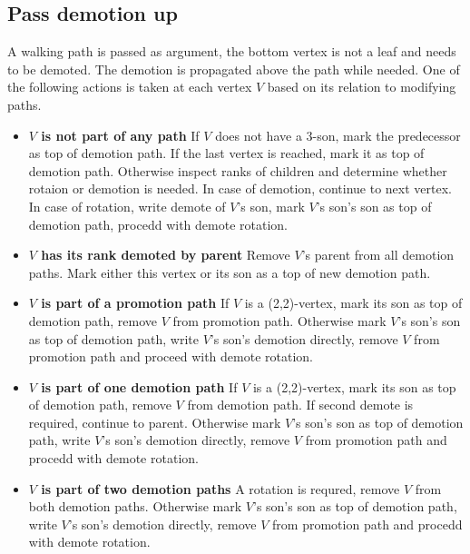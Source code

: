 \subsection{Pass demotion up}

A walking path is passed as argument, the bottom vertex is not a leaf and needs to be demoted. The demotion is propagated above the path while needed. One of the following actions is taken at each vertex $V$ based on its relation to modifying paths.

\begin{itemize}

\item {\bfseries $V$ is not part of any path} If $V$ does not have a 3-son, mark the predecessor as top of demotion path. If the last vertex is reached, mark it as top of demotion path.  Otherwise inspect ranks of children and determine whether rotaion or demotion is needed. In case of demotion, continue to next vertex. In case of rotation, write demote of $V$'s son, mark $V$'s son's son as top of demotion path, procedd with demote rotation.

\item {\bfseries $V$ has its rank demoted by parent} Remove $V$'s parent from all demotion paths. Mark either this vertex or its son as a top of new demotion path.

\item {\bfseries $V$ is part of a promotion path} If $V$ is a (2,2)-vertex, mark its son as top of demotion path, remove $V$ from promotion path. Otherwise mark $V$'s son's son as top of demotion path, write $V$'s son's demotion directly, remove $V$ from promotion path and proceed with demote rotation. 

\item {\bfseries $V$ is part of one demotion path} If $V$ is a (2,2)-vertex, mark its son as top of demotion path, remove $V$ from demotion path. If second demote is required, continue to parent. Otherwise mark $V$'s son's son as top of demotion path, write $V$'s son's demotion directly, remove $V$ from promotion path and procedd with demote rotation. 

\item {\bfseries $V$ is part of two demotion paths} A rotation is requred, remove $V$ from both demotion paths. Otherwise mark $V$'s son's son as top of demotion path, write $V$'s son's demotion directly, remove $V$ from promotion path and procedd with demote rotation.

\end{itemize}


